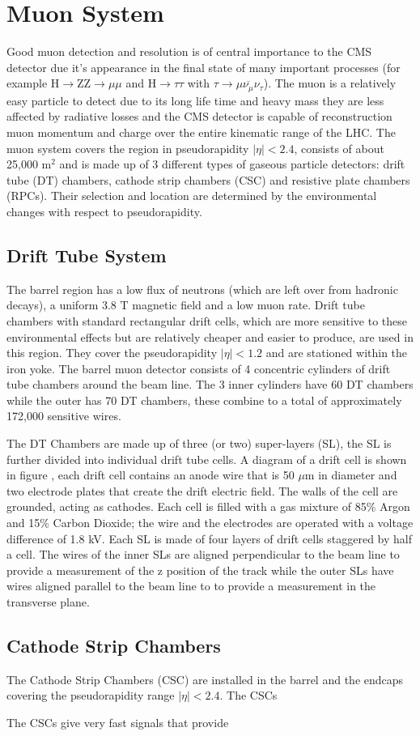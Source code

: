 \section{Muon System}
Good muon detection and resolution is of central importance 
to the CMS detector due it's appearance in the final state of many important processes
(for example H$\rightarrow$ZZ$\rightarrow\mu\mu$ and H$\rightarrow\tau\tau$ 
with $\tau\rightarrow\mu\overbar{\nu_{\mu}}\nu_{\tau}$). 
The muon is a relatively easy particle to detect due to its long life time 
and heavy mass they are less affected by radiative losses and the
CMS detector is capable of reconstruction muon momentum and charge over the entire
kinematic range of the LHC. The muon system covers the region in pseudorapidity
$|\eta|<2.4$, consists of about 25,000 m$^{2}$ and is made up of 3
 different types of gaseous particle detectors: drift tube (DT) chambers, 
 cathode strip chambers (CSC) and resistive plate chambers (RPCs).
 Their selection and location are determined by the environmental
 changes with respect to pseudorapidity. %
 
\subsection{Drift Tube System}
The barrel region has a low flux of neutrons (which are left over 
from hadronic decays), a uniform 3.8 T magnetic field and a low 
muon rate. Drift tube chambers with standard rectangular drift cells, 
which are more sensitive to  these environmental effects but are %
relatively cheaper and easier to produce, are used in this region. 
They cover the pseudorapidity $|\eta|<1.2$ and are stationed within 
the iron yoke. The barrel muon detector consists of 4 concentric
cylinders of drift tube chambers around the beam line. The 3 inner
cylinders have 60 DT chambers while the outer has 70 DT chambers,
these combine to a total of approximately 172,000 sensitive wires.

The DT Chambers are made up of three (or two) super-layers (SL), the 
SL is further divided into individual drift tube cells. 
A diagram of a drift cell is shown in figure ,%
each drift cell contains an anode wire that is 50 $\mu$m in diameter
and two electrode plates that create the drift electric field. The walls
of the cell are grounded, acting as cathodes. Each cell is filled with a gas
mixture of 85\% Argon and 15\% Carbon Dioxide; the wire and the
electrodes are operated with a voltage difference of 1.8 kV. Each
SL is made of four layers of drift cells staggered by half a cell.
The wires of the inner SLs are aligned perpendicular to the beam line
to provide a measurement of the z position of the track while the 
outer SLs have wires aligned parallel to the beam line to 
to provide a measurement in the transverse plane. 

\subsection{Cathode Strip Chambers}
The Cathode Strip Chambers (CSC) are installed in the barrel and the endcaps %
covering the pseudorapidity range $|\eta|<2.4$. The CSCs 

The CSCs give very fast signals that provide 
